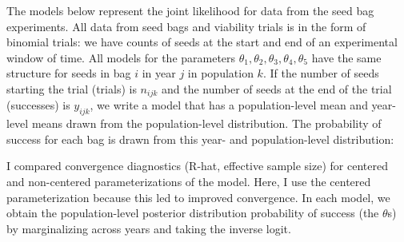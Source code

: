 \documentclass[12pt, oneside, titlepage]{article}   	%
\begin{document}
The models below represent the joint likelihood for data from the seed bag experiments. All data from seed bags and viability trials is in the form of binomial trials: we have counts of seeds at the start and end of an experimental window of time. All models for the parameters $\theta_1, \theta_2, \theta_3, \theta_4, \theta_5$ have the same structure for seeds in bag $i$ in year $j$ in population $k$. If the number of seeds starting the trial (trials) is $n_{ijk}$ and the number of seeds at the end of the trial (successes) is $y_{ijk}$, we write a model that has a population-level mean and year-level means drawn from the population-level distribution. The probability of success for each bag is drawn from this year- and population-level distribution:

I compared convergence diagnostics (R-hat, effective sample size) for centered and non-centered parameterizations of the model. Here, I use the centered parameterization because this led to improved convergence. In each model, we obtain the population-level posterior distribution probability of success (the $\theta$s) by marginalizing across years and taking the inverse logit.

\clearpage
\newpage
\end{document}
